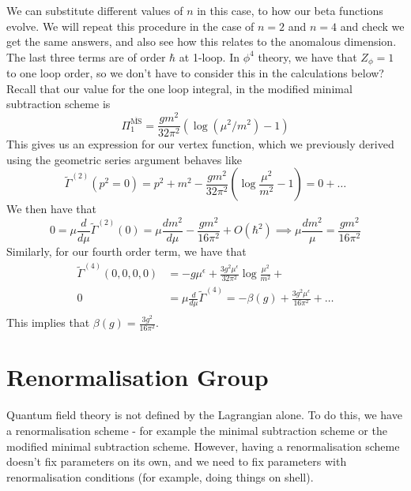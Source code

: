 \documentclass[11pt, oneside]{article}   	%
\theoremstyle{slanted}
\begin{document}
We can substitute different values 
of $ n $ in this case, to how our beta functions 
evolve. We will repeat this procedure 
in the case of  $ n = 2 $ and $  n = 4  $ 
and check we get the same answers, and also 
see how this relates to the anomalous dimension. 
The last three terms are of 
order $ \hbar $ at 1-loop. 
In $ \phi ^ 4 $ theory, we have 
that $ Z _{ \phi }  = 1$ to one loop order, 
so we don't have to consider this in the calculations 
below? 
Recall that our value for the one loop 
integral, 
in the modified minimal subtraction scheme is 
\[
\Pi _ 1 ^{ \overline{\text{MS}}} =  \frac{g m ^ 2 }{ 32 \pi ^ 2 } 
\left( \log \left( \mu ^ 2  / m ^ 2  \right)   -1  \right)  
\] This gives us an expression for our vertex function, 
which we previously derived using the 
geometric series argument 
behaves like 
\[
\tilde{ \Gamma } ^{ \left(   2  \right)  } 
\left(  p ^ 2  =0  \right)   = p ^ 2 + m ^ 2  - 
\frac{gm ^ 2  }{ 32 \pi ^ 2} \left( \log \frac{\mu ^ 2 }{ m ^ 2 }  - 1  \right)   = 
0 + \dots 
\] We then have that 
\[
0 = \mu \frac{d }{ d \mu } \tilde{ \Gamma } ^{ \left( 2  \right)   } 
\left(  0  \right)    = \mu \frac{d m ^ 2  }{d \mu }  - \frac{gm ^ 2 }{ 
16 \pi ^ 2 } + O \left( \hbar ^ 2  \right)  
\implies \mu \frac{ d m ^ 2 	  }{ \mu 	 } = \frac{g m ^ 2 }{ 16 \pi ^ 2 }
\]  
Similarly, for our fourth order term, 
we have that 
\begin{align*}
\tilde{\Gamma }^{ \left( 4  \right)   } 
\left(  0 , 0 , 0 , 0  \right)   & = - g \mu ^{ \epsilon } 
+ \frac{3 g ^ 2 \mu ^{ \epsilon }  }{32 \pi ^ 2  } 
\log \frac{ \mu ^ 2 }{ m ^ 2 } + \\
0 &=  \mu \frac{d  }{d \mu  } \tilde{\Gamma } ^{ \left( 4  \right)  }  = 
- \beta (g ) + \frac{3 g ^ 2 \mu ^{ \epsilon }  }{ 16 \pi ^ 2 } + \dots  \\ 
\end{align*}This implies that $ \beta (g )  = \frac{3 g ^ 2 }{ 16 \pi ^ 2 } $. 

\pagebreak 
\section{Renormalisation Group}
Quantum field theory is not 
defined by the Lagrangian alone. To 
do this, we have a renormalisation scheme - for example 
the minimal subtraction scheme or the modified minimal subtraction scheme. However, 
having a renormalisation scheme doesn't fix parameters 
on its own, and we need to fix parameters with renormalisation conditions
(for example, doing things on shell). 
\end{document}
